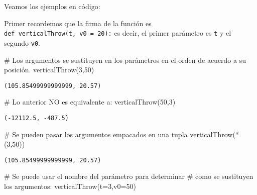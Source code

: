 \documentclass[
  letterpaper,
  DIV=11,
  numbers=noendperiod]{scrreprt}
\newenvironment{Shaded}{\begin{snugshade}}{\end{snugshade}}
\newcommand{\CommentTok}[1]{\textcolor[rgb]{0.37,0.37,0.37}{#1}}
\newcommand{\DecValTok}[1]{\textcolor[rgb]{0.68,0.00,0.00}{#1}}
\newcommand{\NormalTok}[1]{\textcolor[rgb]{0.00,0.23,0.31}{#1}}
\newcommand{\OperatorTok}[1]{\textcolor[rgb]{0.37,0.37,0.37}{#1}}
\begin{document}
Veamos los ejemplos en código:

Primer recordemos que la firma de la función es
\texttt{def\ verticalThrow(t,\ v0\ =\ 20):} es decir, el primer
parámetro es \texttt{t} y el segundo \texttt{v0}.

\begin{Shaded}
\begin{Highlighting}[]
\CommentTok{\# Los argumentos se sustituyen en los parámetros en el orden de acuerdo a su posición.}
\NormalTok{verticalThrow(}\DecValTok{3}\NormalTok{,}\DecValTok{50}\NormalTok{)}
\end{Highlighting}
\end{Shaded}

\begin{verbatim}
(105.85499999999999, 20.57)
\end{verbatim}

\begin{Shaded}
\begin{Highlighting}[]
\CommentTok{\# Lo anterior NO es equivalente a:}
\NormalTok{verticalThrow(}\DecValTok{50}\NormalTok{,}\DecValTok{3}\NormalTok{)}
\end{Highlighting}
\end{Shaded}

\begin{verbatim}
(-12112.5, -487.5)
\end{verbatim}

\begin{Shaded}
\begin{Highlighting}[]
\CommentTok{\# Se pueden pasar los argumentos empacados en una tupla}
\NormalTok{verticalThrow(}\OperatorTok{*}\NormalTok{(}\DecValTok{3}\NormalTok{,}\DecValTok{50}\NormalTok{))}
\end{Highlighting}
\end{Shaded}

\begin{verbatim}
(105.85499999999999, 20.57)
\end{verbatim}

\begin{Shaded}
\begin{Highlighting}[]
\CommentTok{\# Se puede usar el nombre del parámetro para determinar}
\CommentTok{\# como se sustituyen los argumentos:}
\NormalTok{verticalThrow(t}\OperatorTok{=}\DecValTok{3}\NormalTok{,v0}\OperatorTok{=}\DecValTok{50}\NormalTok{)}
\end{Highlighting}
\end{Shaded}
\end{document}
